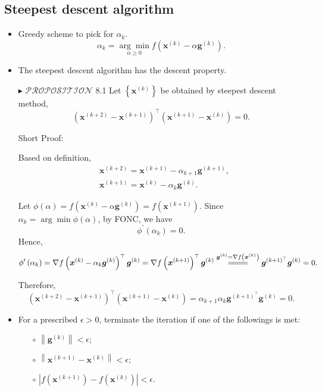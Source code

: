 \documentclass[12pt,thmsa]{article}
\begin{document}
\subsection{Steepest descent algorithm }
\begin{itemize}
	\item Greedy scheme to pick for \(\alpha_{k}\).
	\[
		\alpha_{k}=\underset{\alpha \geq 0}{\arg \min } f\left(\boldsymbol{x}^{(k)}-\alpha \boldsymbol{g}^{(k)} \right) .
	\]
	\item The steepest descent algorithm has the descent property.
	
	\item[\(\blacktriangleright\)] \(\mathscr{PROPOSITION}\) 8.1 Let \(\left\{\boldsymbol{x}^{(k)}\right\}\) be obtained by steepest descent method,
	\[
		\left( \boldsymbol{x}^{(k+2)}-\boldsymbol{x}^{(k+1)} \right)^{\top} \left( \boldsymbol{x}^{(k+1)}-\boldsymbol{x}^{(k)} \right) = 0.
	\]

	Short Proof:

	Based on definition,
	\[
	\begin{aligned}
		& \boldsymbol{x}^{(k+2)}=\boldsymbol{x}^{(k+1)}-\alpha_{k+1} \boldsymbol{g}^{(k+1)}, \\
		& \boldsymbol{x}^{(k+1)}=\boldsymbol{x}^{(k)}-\alpha_k \boldsymbol{g}^{(k)}.
	\end{aligned}
	\]

	Let \(\phi(\alpha)=f\left(\boldsymbol{x}^{(k)}- \alpha \boldsymbol{g}^{(k)} \right) = f \left( \boldsymbol{x}^{(k+1)} \right) \). Since \(\alpha_k=\arg \min \phi(\alpha)\), by FONC, we have \[\phi^{\prime}\left(\alpha_{k}\right)=0. \]Hence,
	\[
	\phi^{\prime}\left(\alpha_k\right)=\nabla f\left(\boldsymbol{x}^{(k)}-\alpha_k \boldsymbol{g}^{(k)}\right)^{\top} \boldsymbol{g}^{(k)} 
	= \nabla f\left(\boldsymbol{x}^{(k+1)}\right)^{\top} \boldsymbol{g}^{(k)} 
	\overset{\boldsymbol{g}^{(k)}=\nabla f\left(\boldsymbol{x}^{(k)}\right)}{=\joinrel=\joinrel=\joinrel=}
	\boldsymbol{g}^{(k+1)^{\top}} \boldsymbol{g}^{(k)} = 0.
	\]
	
	Therefore,
	\[
	\left(\boldsymbol{x}^{(k+2)}-\boldsymbol{x}^{(k+1)}\right)^{\top}\left(\boldsymbol{x}^{(k+1)}-\boldsymbol{x}^{(k)}\right)=\alpha_{k+1} \alpha_k \boldsymbol{g}^{(k+1)^{\top}} \boldsymbol{g}^{(k)}=0 .
	\]
	
	\item For a prescribed \(\epsilon>0\), terminate the iteration if one of the followings is met:
	\begin{itemize}
		\item[\(\circ\)] \(\left\|\boldsymbol{g}^{(k)}\right\|<\epsilon\);
		\item[\(\circ\)]  \(\left\|\boldsymbol{x}^{(k+1)}-\boldsymbol{x}^{(k)}\right\|<\epsilon\);
		\item[\(\circ\)]  \(\left|f\left(\boldsymbol{x}^{(k+1)}\right)-f\left(\boldsymbol{x}^{(k)}\right)\right|<\epsilon\).
	\end{itemize}


\end{itemize}
\end{document}
